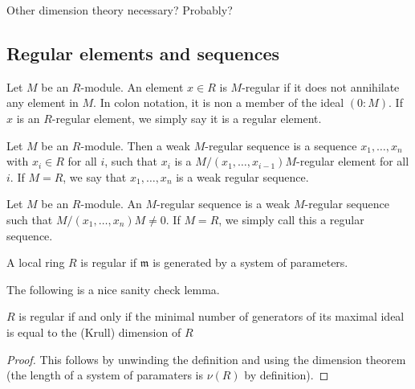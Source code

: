 Other dimension theory necessary? Probably?

\subsection{Regular elements and sequences}

\begin{definition}
  \label{def:reg_elt}
  Let $M$ be an $R$-module.
  An element $x \in R$ is $M$-regular if it does 
  not annihilate any element in $M$.
  In colon notation, it is non a member of the ideal
  $( 0 : M )$.
  If $x$ is an $R$-regular element, we simply say it is 
  a regular element.
\end{definition}

\begin{definition}
  \label{def:weak_reg_seq}
  Let $M$ be an $R$-module.
  Then a weak $M$-regular sequence
  is a sequence $x_1, \ldots, x_n$ 
  with $x_i \in R$ for all $i$,
  such that 
  $x_i$ is a
  $M / (x_1, \ldots, x_{i-1}) M$-regular
  element for all $i$.
  If $M = R$, we say that $x_1, \ldots, x_n$
  is a weak regular sequence. 
\end{definition}

\begin{definition}
  \label{def:reg_seq}
  Let $M$ be an $R$-module.
  An $M$-regular sequence is a weak $M$-regular sequence
  such that $M / (x_1, \ldots, x_n) M \neq 0$.
  If $M = R$, we simply call this a regular sequence.
\end{definition}


\begin{definition}
  \label{def:reg_loc}
  A local ring $R$ is regular if 
  $\mathfrak{m}$ is generated by a system of parameters.
\end{definition}

The following is a nice sanity check lemma.

\begin{lemma}
    \label{lem:reg_maximal_dim_generators}
    \(R\) is regular if and only if 
    the minimal number of generators of its maximal
    ideal is equal to the (Krull) dimension of \(R\)
\end{lemma}

\begin{proof}
    This follows by unwinding the definition 
    and using the dimension theorem 
    (the length of a system of paramaters is \(\nu(R)\)
    by definition).
\end{proof}

